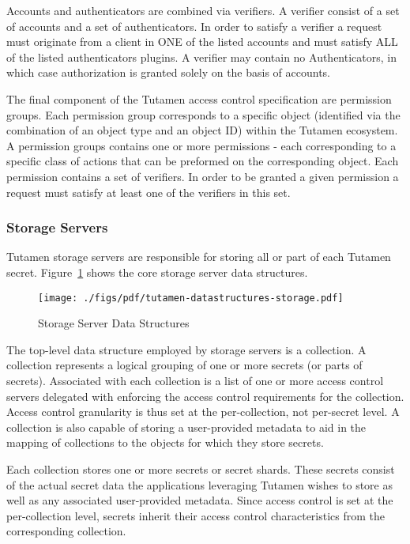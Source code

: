 Accounts and authenticators are combined via verifiers. A verifier
consist of a set of accounts and a set of authenticators. In order to
satisfy a verifier a request must originate from a client in ONE of
the listed accounts and must satisfy ALL of the listed authenticators
plugins. A verifier may contain no Authenticators, in which case
authorization is granted solely on the basis of accounts.

The final component of the Tutamen access control specification are
permission groups. Each permission group corresponds to a specific
object (identified via the combination of an object type and an object
ID) within the Tutamen ecosystem. A permission groups contains one or
more permissions - each corresponding to a specific class of actions
that can be preformed on the corresponding object. Each permission
contains a set of verifiers. In order to be granted a given permission
a request must satisfy at least one of the verifiers in this set.

\subsubsection{Storage Servers}

Tutamen storage servers are responsible for storing all or part of
each Tutamen secret. Figure~\ref{fig:tutamen:storagestructs} shows the
core storage server data structures.

\begin{figure}[th]
  \centering
  \texttt{[image: ./figs/pdf/tutamen-datastructures-storage.pdf]}
  \caption{Storage Server Data Structures}
  \label{fig:tutamen:storagestructs}
\end{figure}

The top-level data structure employed by storage servers is a
collection. A collection represents a logical grouping of one or more
secrets (or parts of secrets). Associated with each collection is a
list of one or more access control servers delegated with enforcing
the access control requirements for the collection. Access control
granularity is thus set at the per-collection, not per-secret level. A
collection is also capable of storing a user-provided metadata to aid
in the mapping of collections to the objects for which they store
secrets.

Each collection stores one or more secrets or secret shards. These
secrets consist of the actual secret data the applications leveraging
Tutamen wishes to store as well as any associated user-provided
metadata. Since access control is set at the per-collection level,
secrets inherit their access control characteristics from the
corresponding collection.

